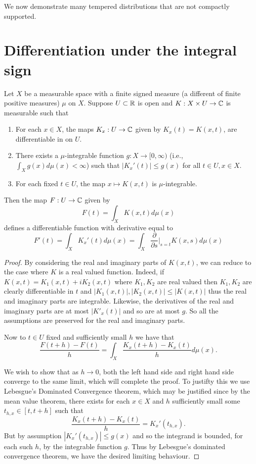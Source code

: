 \documentclass[twoside, a4paper, 10pt]{amsart}
\begin{document}
We now demonstrate many tempered distributions that are not compactly supported.

\appendix

\section{Differentiation under the integral sign}

\begin{prop} \label{prop: diff under int} Let $X$ be a measurable space with a finite signed measure (a different of finite positive measures) $\mu$ on $X$. Suppose $U \subset \mathbb{R}$ is open and $K:X \times U \to \mathbb{C}$ is measurable such that

\begin{enumerate}
	\item For each $x \in X$, the maps $K_x:U \to \mathbb{C}$ given by $K_x(t) = K(x,t)$, are differentiable in on $U$. 
	\item There exists a $\mu$-integrable function $g:X \to [0,\infty)$ (i.e., $\int_X g(x) d\mu(x) < \infty$) such that $|K_x'(t)| \leq g(x)$ for all $t \in U, x \in X$.
	\item For each fixed $t \in U$, the map $x \mapsto K(x,t)$ is $\mu$-integrable.
\end{enumerate}

Then the map $F:U \to \mathbb{C}$ given by $$F(t) = \int_{X} K(x,t) d\mu(x)$$ defines a differentiable function with derivative equal to $$F'(t) = \int_X K_x'(t) d\mu(x) = \int_X \frac{\partial}{\partial s}|_{s = t} K(x,s) d\mu(x)$$

\end{prop}

\begin{proof} By considering the real and imaginary parts of $K(x,t)$, we can reduce to the case where $K$ is a real valued function. Indeed, if $K(x,t) = K_1(x,t) + iK_2(x,t)$ where $K_1,K_2$ are real valued then $K_1,K_2$ are clearly differentiable in $t$ and $|K_1(x,t)|, |K_2(x,t)|  \leq |K(x,t)|$ thus the real and imaginary parts are integrable. Likewise, the derivatives of the real and imaginary parts are at most $|K'_x(t)|$ and so are at most $g$. So all the assumptions are preserved for the real and imaginary parts.

Now to $t \in U$ fixed and sufficiently small $h$ we have that $$\frac{F(t+h) - F(t)}{h} = \int_X \frac{K_x(t+h) - K_x(t)}{h} d\mu(x).$$

We wish to show that as $h \to 0$, both the left hand side and right hand side converge to the same limit, which will complete the proof. To justifty this we use Lebesgue's Dominated Convergence theorem, which may be justified since by the mean value theorem, there exists for each $x \in X$ and $h$ sufficiently small some $t_{h,x} \in [t,t+h]$ such that $$\frac{K_x(t+h) - K_x(t)}{h} = K_x'(t_{h,x}).$$ But by assumption $|K_x'(t_{h,x})| \leq g(x)$ and so the integrand is bounded, for each such $h$, by the integrable function $g$. Thus by Lebesgue's dominated convergence theorem, we have the desired limiting behaviour. \end{proof}
\end{document}
